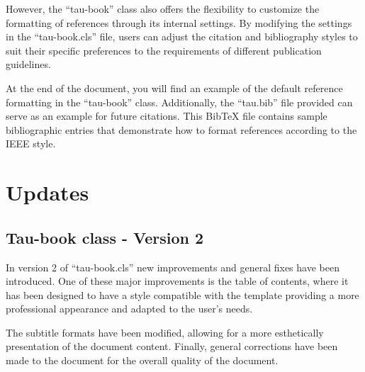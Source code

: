 \documentclass[10pt,a4paper,twoside]{main}
\begin{document}
    However, the ``tau-book'' class \cite{dirac} also offers the flexibility to customize the formatting of references through its internal settings. By modifying the settings in the ``tau-book.cls'' file, users can adjust the citation and bibliography styles to suit their specific preferences to the requirements of different publication guidelines.

    At the end of the document, you will find an example of the default reference formatting in the ``tau-book'' class. Additionally, the ``tau.bib'' file provided can serve as an example for future citations. This BibTeX file contains sample bibliographic entries that demonstrate how to format references according to the IEEE style.

\section{Updates}

    \subsection{Tau-book class - Version 2}

        In version 2 of ``tau-book.cls'' new improvements and general fixes have been introduced. One of these major improvements is the table of contents, where it has been designed to have a style compatible with the template providing a more professional appearance and adapted to the user's needs.

        The subtitle formats have been modified, allowing for a more esthetically presentation of the document content. Finally, general corrections have been made to the document for the overall quality of the document.


\printbibliography

\end{document}
